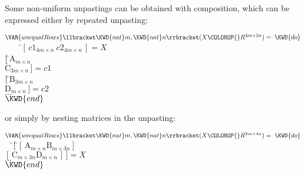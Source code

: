 Some non-uniform unpastings can be obtained with composition,
which can be expressed either by repeated unpasting:
\begin{Fortress}
\(\VAR{unequalRows}\llbracket\KWD{nat} m, \KWD{nat} n\rrbracket(X\COLONOP{}R^{4m \times 2n}) = \;\KWD{do}\)\\
{\tt~~~~}\pushtabs\=\+\(    [\,c1_{4m \times n} \  c2_{4m \times n}\,] = X\)\\
\(    [\,\null\)\pushtabs\=\+\(\mathrm{A}_{m \times n}\)\\
\(      \mathrm{C}_{3m \times n}\,] = c1\)\-\\\poptabs
\(    [\,\null\)\pushtabs\=\+\(\mathrm{B}_{3m \times n}\)\\
\(      \mathrm{D}_{m \times n}\,] = c2\)\-\\\poptabs
\(    \ldots\)\-\\\poptabs
\(\KWD{end}\)
\end{Fortress}
or simply by nesting matrices in the unpasting:
\begin{Fortress}
\(\VAR{unequalRows}\llbracket\KWD{nat} m, \KWD{nat} n\rrbracket(X\COLONOP{}R^{2m \times 4n}) = \;\KWD{do}\)\\
{\tt~~}\pushtabs\=\+\(  [\,\null\)\pushtabs\=\+\([\,\mathrm{A}_{m \times n}  \mathrm{B}_{m \times 3n}]\)\\
\(    [\,\mathrm{C}_{m \times 3n} \mathrm{D}_{m \times n}\,] \,] = X\)\-\\\poptabs
\(  \ldots\)\-\\\poptabs
\(\KWD{end}\)
\end{Fortress}
